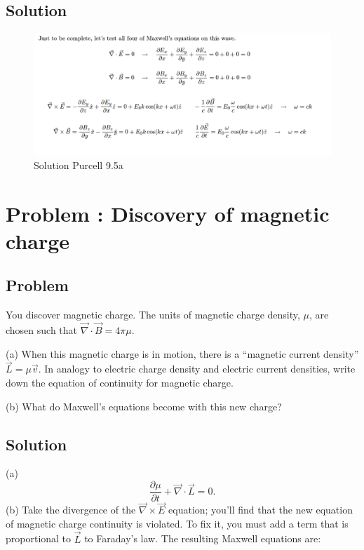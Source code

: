 \documentclass[solutions]{esg8022pset}
\begin{document}
\subsection{Solution}
 \begin{figure}[H]
    \centering
    \includegraphics[width = 15cm]{solpu905a}
    \caption{Solution Purcell 9.5a}
  \end{figure}
\section{Problem \thesection: Discovery of magnetic charge}
\subsection{Problem}
You discover magnetic
charge.  The units of magnetic charge density,
$\mu$, are chosen such that $\vec\nabla\cdot\vec B = 4\pi\mu$.

\par\noindent (a) When this magnetic charge is in motion,
there is a ``magnetic current density'' $\vec L = \mu \vec v$.  In
analogy to electric charge density and electric current densities,
write down the equation of continuity for magnetic charge.

\par\noindent (b) What do Maxwell's equations become with this
new charge?
\subsection{Solution}
(a) \begin{equation}
\frac{\partial \mu}{\partial t}+\vec{\nabla}\cdot\vec{L}=0.
\end{equation}
(b) Take the divergence of the $\vec\nabla\times\vec E$ equation; you'll
find that the new equation of magnetic charge continuity is violated.
To fix it, you must add a term that is proportional to $\vec L$ to
Faraday's law.  The resulting Maxwell equations are:
\end{document}
